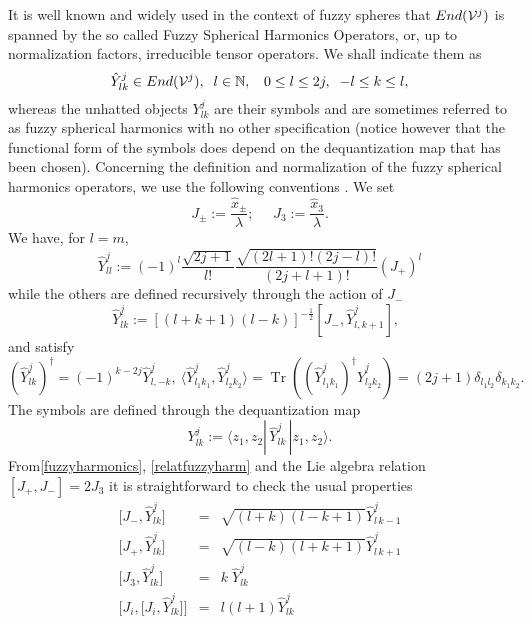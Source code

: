 \documentclass[a4paper,11pt]{article}
\numberwithin{equation}{section}
\DeclareMathOperator{\tr}{Tr}
\theoremstyle{nonumberplain}
\begin{document}
It is well known and widely used  in the  context of fuzzy spheres  that $End({\cal{V}}^j)$
 is spanned by  the so called Fuzzy Spherical Harmonics Operators, or, up to normalization factors,  irreducible tensor operators.
 We shall indicate them as
 \begin{equation}
 \hat Y^j_{lk}\in End({\cal{V}}^j),\;\; l\in\mathbb{N},\;\; \ 0\le l\le 2j,\;\; -l\le k\le l,
  \end{equation}
  whereas the unhatted objects $Y^j_{lk}$ are their symbols and are sometimes referred to as fuzzy spherical harmonics with no other specification (notice however
that the  functional form  of the symbols does depend on the dequantization map that has been chosen).
Concerning  the definition and normalization of the fuzzy spherical harmonics operators, we use the following conventions \cite{Das}. We set
 \begin{equation}
  J_{\pm}:=\frac{{\hat x}_{\pm}}{\lambda}; ~~~~~~J_3:=\frac{{\hat x}_{3}}{\lambda} .
 \end{equation}
We have, for $l=m$,
 \begin{equation}
\hat Y^j_{ll}:=(-1)^l  \frac{ \sqrt{2j+1}}{ l !}
\frac {\sqrt{ (2l+1)! (2j-l)! } } { (2j+l+1)!}  (J_+)^l   \label{highestfuzzyharmonics}
\end{equation}
while the others  are defined recursively through the action of $J_-$
 \begin{equation}
\hat Y^j_{lk}:= [ (l+k+1) (l-k)]^{-\frac{1}{2}} [J_-,\hat Y^j_{l,k+1}],\;\;  \label{fuzzyharmonics}
\end{equation}
and satisfy
 \begin{equation}
(\hat Y^j_{lk})^\dag=(-1)^{k-2j} \hat Y^j_{l,-k},\
\langle \hat Y^j_{l_1 k_1},\hat Y^j_{l_2 k_2}\rangle=\tr((\hat Y^j_{l_1k_1})^\dag{ \hat Y}^j_{l_2k_2})=(2j+1)\delta_{l_1l_2}\delta_{k_1k_2} \label{relatfuzzyharm}.
\end{equation}
The symbols are defined through the dequantization map 
 \begin{equation}
Y^j_{lk}:=\langle z_1,z_2|\,\hat Y^j_{lk}\,|z_1,z_2\rangle. \label{fuzzyha}
\end{equation}
From\eqref{fuzzyharmonics}, \eqref{relatfuzzyharm} and the Lie algebra relation $[J_+,J_-]= 2J_3$ it is straightforward to check the usual properties
\begin{eqnarray}
{[} J_{-},{\hat Y}^j_{lk} { ] }&=& \sqrt{ (l+k)(l-k+1) } { \hat Y}^{j}_{l \, k-1}  \\
{[} J_{+},{\hat Y}^j_{lk} { ] }&=& \sqrt{(l-k)(l+k+1)} { \hat Y}^{j}_{l \, k+1} \\
{[}J_3,{\hat Y}^j_{lk} { ] } &=& k\; {\hat Y}^{j}_{l  k}\\
{[} J_{i},{[} J_{i},{\hat Y}^j_{lk} {]} {]}&=& l(l+1) {\hat Y}^{j}_{l  k}
\end{eqnarray}
\end{document}
